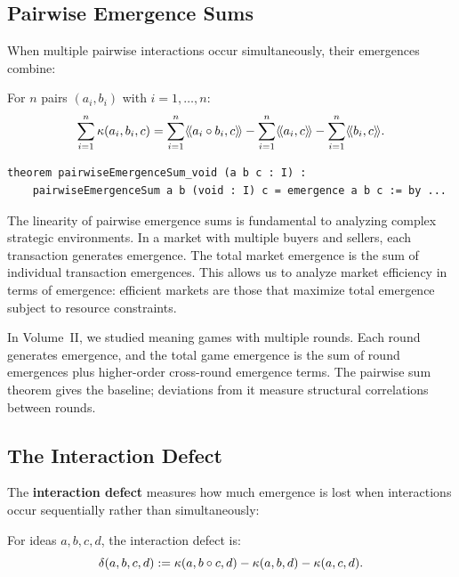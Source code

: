 \subsection{Pairwise Emergence Sums}

When multiple pairwise interactions occur simultaneously, their emergences combine:

\begin{theorem}
\label{thm:pairwise-emergence-sum}
For $n$ pairs $(a_i, b_i)$ with $i = 1, \ldots, n$:
\[
  \sum_{i=1}^n \kappa(a_i, b_i, c) =
  \sum_{i=1}^n \langle\!\langle a_i \circ b_i, c \rangle\!\rangle
  - \sum_{i=1}^n \langle\!\langle a_i, c \rangle\!\rangle
  - \sum_{i=1}^n \langle\!\langle b_i, c \rangle\!\rangle.
\]
\end{theorem}

\begin{lstlisting}[caption={Pairwise emergence sums (IDT\_v3\_Emergence.lean)}]
theorem pairwiseEmergenceSum_void (a b c : I) :
    pairwiseEmergenceSum a b (void : I) c = emergence a b c := by ...
\end{lstlisting}

\begin{interpretation}
The linearity of pairwise emergence sums is fundamental to analyzing complex
strategic environments. In a market with multiple buyers and sellers, each
transaction generates emergence. The total market emergence is the sum of
individual transaction emergences. This allows us to analyze market efficiency
in terms of emergence: efficient markets are those that maximize total emergence
subject to resource constraints.

In Volume~II, we studied meaning games with multiple rounds. Each round
generates emergence, and the total game emergence is the sum of round emergences
plus higher-order cross-round emergence terms. The pairwise sum theorem gives
the baseline; deviations from it measure structural correlations between rounds.
\end{interpretation}


\subsection{The Interaction Defect}

The \textbf{interaction defect} measures how much emergence is lost when
interactions occur sequentially rather than simultaneously:

\begin{definition}
\label{def:interaction-defect}
For ideas $a, b, c, d$, the interaction defect is:
\[
  \delta(a,b,c,d) := \kappa(a, b \circ c, d) - \kappa(a, b, d) - \kappa(a, c, d).
\]
\end{definition}

